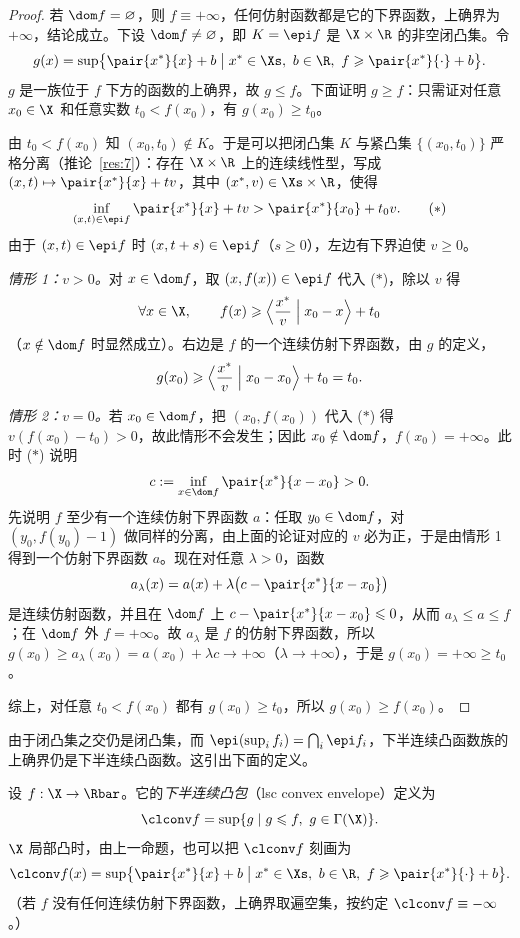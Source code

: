 \begin{proof}
若 $\dom f=\varnothing$，则 $f\equiv+\infty$，任何仿射函数都是它的下界函数，上确界为 $+\infty$，结论成立。下设 $\dom f\neq\varnothing$，即 $K=\epi f$ 是 $\X\times\R$ 的非空闭凸集。令
\[
  g(x)=\sup\bigl\{\pair{x^*}{x}+b \bigm| x^*\in\Xs,\ b\in\R,\ f\geqslant\pair{x^*}{\cdot}+b\bigr\}.
\]
$g$ 是一族位于 $f$ 下方的函数的上确界，故 $g\leqslant f$。下面证明 $g\geqslant f$：只需证对任意 $x_0\in\X$ 和任意实数 $t_0<f(x_0)$，有 $g(x_0)\geqslant t_0$。

由 $t_0<f(x_0)$ 知 $(x_0,t_0)\notin K$。于是可以把闭凸集 $K$ 与紧凸集 $\{(x_0,t_0)\}$ 严格分离（推论~\ref{res:7}）：存在 $\X\times\R$ 上的连续线性型，写成 $(x,t)\mapsto\pair{x^*}{x}+tv$，其中 $(x^*,v)\in\Xs\times\R$，使得
\[
  \inf_{(x,t)\in\epi f}\pair{x^*}{x}+tv>\pair{x^*}{x_0}+t_0v. \tag{$\ast$}
\]
由于 $(x,t)\in\epi f$ 时 $(x,t+s)\in\epi f$（$s\geqslant0$），左边有下界迫使 $v\geqslant0$。

\emph{情形 1：$v>0$。}对 $x\in\dom f$，取 $(x,f(x))\in\epi f$ 代入 ($\ast$)，除以 $v$ 得
\[
  \forall x\in\X,\qquad f(x)\geqslant\Bigl\langle\frac{x^*}{v}\Bigm| x_0-x\Bigr\rangle+t_0
\]
（$x\notin\dom f$ 时显然成立）。右边是 $f$ 的一个连续仿射下界函数，由 $g$ 的定义，
\[
  g(x_0)\geqslant\Bigl\langle\frac{x^*}{v}\Bigm| x_0-x_0\Bigr\rangle+t_0=t_0 .
\]

\emph{情形 2：$v=0$。}若 $x_0\in\dom f$，把 $(x_0,f(x_0))$ 代入 ($\ast$) 得 $v(f(x_0)-t_0)>0$，故此情形不会发生；因此 $x_0\notin\dom f$，$f(x_0)=+\infty$。此时 ($\ast$) 说明
\[
  c:=\inf_{x\in\dom f}\pair{x^*}{x-x_0}>0 .
\]
先说明 $f$ 至少有一个连续仿射下界函数 $a$：任取 $y_0\in\dom f$，对 $(y_0,f(y_0)-1)$ 做同样的分离，由上面的论证对应的 $v$ 必为正，于是由情形 1 得到一个仿射下界函数 $a$。现在对任意 $\lambda>0$，函数
\[
  a_\lambda(x)=a(x)+\lambda\bigl(c-\pair{x^*}{x-x_0}\bigr)
\]
是连续仿射函数，并且在 $\dom f$ 上 $c-\pair{x^*}{x-x_0}\leqslant0$，从而 $a_\lambda\leqslant a\leqslant f$；在 $\dom f$ 外 $f=+\infty$。故 $a_\lambda$ 是 $f$ 的仿射下界函数，所以 $g(x_0)\geqslant a_\lambda(x_0)=a(x_0)+\lambda c\to+\infty$（$\lambda\to+\infty$），于是 $g(x_0)=+\infty\geqslant t_0$。

综上，对任意 $t_0<f(x_0)$ 都有 $g(x_0)\geqslant t_0$，所以 $g(x_0)\geqslant f(x_0)$。
\end{proof}

由于闭凸集之交仍是闭凸集，而 $\epi(\sup_if_i)=\bigcap_i\epi f_i$，下半连续凸函数族的上确界仍是下半连续凸函数。这引出下面的定义。

\begin{definition}[下半连续凸包]
\label{def:17}
设 $f:\X\to\Rbar$。它的\emph{下半连续凸包}（lsc convex envelope）定义为
\[
  \clconv f=\sup\{g \mid g\leqslant f,\ g\in\Gamma(\X)\}.
\]
$\X$ 局部凸时，由上一命题，也可以把 $\clconv f$ 刻画为
\[
  \clconv f(x)=\sup\bigl\{\pair{x^*}{x}+b \bigm| x^*\in\Xs,\ b\in\R,\ f\geqslant\pair{x^*}{\cdot}+b\bigr\}.
\]
（若 $f$ 没有任何连续仿射下界函数，上确界取遍空集，按约定 $\clconv f\equiv-\infty$。）
\end{definition}


